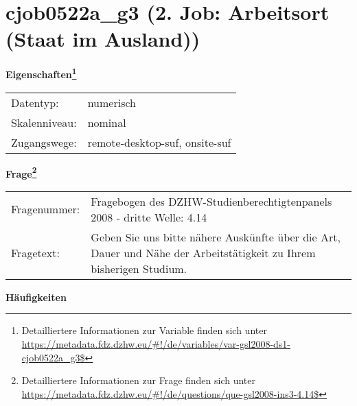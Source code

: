 
    \setcounter{footnote}{0}

    \vspace*{-1.8cm}
	\section{cjob0522a\_g3 (2. Job: Arbeitsort (Staat im Ausland))}
	\label{section:cjob0522a_g3}



    \vspace*{0.5cm}
    \noindent\textbf{Eigenschaften\footnote{Detailliertere Informationen zur Variable finden sich unter
		\url{https://metadata.fdz.dzhw.eu/\#!/de/variables/var-gsl2008-ds1-cjob0522a_g3$}}}\\
	\begin{tabularx}{\hsize}{@{}lX}
	Datentyp: & numerisch \\
	Skalenniveau: & nominal \\
	Zugangswege: &
	  remote-desktop-suf, 
	  onsite-suf
 \\
    \end{tabularx}



				\vspace*{0.5cm}
                \noindent\textbf{Frage\footnote{Detailliertere Informationen zur Frage finden sich unter
		              \url{https://metadata.fdz.dzhw.eu/\#!/de/questions/que-gsl2008-ins3-4.14$}}}\\
				\begin{tabularx}{\hsize}{@{}lX}
					Fragenummer: &
					  Fragebogen des DZHW-Studienberechtigtenpanels 2008 - dritte Welle:
					  4.14
 \\
					Fragetext: & Geben Sie uns bitte nähere Auskünfte über die Art, Dauer und Nähe der Arbeitstätigkeit zu Ihrem bisherigen Studium. \\
				\end{tabularx}





        		\vspace*{0.5cm}
                \noindent\textbf{Häufigkeiten}

